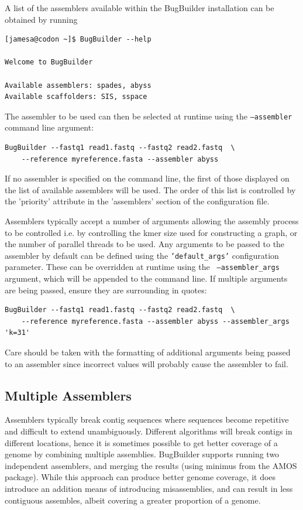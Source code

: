 \documentclass[a4paper,10pt]{article}
\begin{document}
A list of the assemblers available within the BugBuilder installation can be obtained by running

\begin{verbatim}
[jamesa@codon ~]$ BugBuilder --help

Welcome to BugBuilder

Available assemblers: spades, abyss
Available scaffolders: SIS, sspace
\end{verbatim}

The assembler to be used can then be selected at runtime using the {\tt --assembler} command line
argument: 

\begin{verbatim}
BugBuilder --fastq1 read1.fastq --fastq2 read2.fastq  \
    --reference myreference.fasta --assembler abyss 
\end{verbatim}

If no assembler is specified on the command line, the first of those displayed on the list of
available assemblers will be used. The order of this list is controlled by the 'priority' attribute
in the 'assemblers' section of the configuration file.

Assemblers typically accept a number of arguments allowing the assembly process to be controlled
i.e. by controlling the kmer size used for constructing a graph, or the number of parallel threads
to be used. Any arguments to be passed to the assembler by default can be defined using the
{\tt 'default\_args'} configuration parameter. These can be overridden at runtime using the {\tt
--assembler\_args} argument, which will be appended to the command line. If multiple arguments are
being passed, ensure they are surrounding in quotes: 

\begin{verbatim}
BugBuilder --fastq1 read1.fastq --fastq2 read2.fastq  \
    --reference myreference.fasta --assembler abyss --assembler_args 'k=31'
\end{verbatim}

Care should be taken with the formatting of additional arguments being passed to an assembler since
incorrect values will probably cause the assembler to fail.

\subsection{Multiple Assemblers}

Assemblers typically break contig sequences where sequences become repetitive and difficult to
extend unambiguously. Different algorithms will break contigs in different locations, hence it is
sometimes possible to get better coverage of a genome by combining multiple assemblies. BugBuilder
supports running two independent assemblers, and merging the results (using minimus from the AMOS
package). While this approach can produce better genome coverage, it does introduce an addition
means of introducing misassemblies, and can result in less contiguous assembles, albeit covering a
greater proportion of a genome. 
\end{document}
